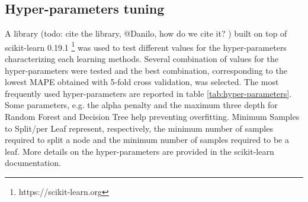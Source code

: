 \documentclass[a4paper, 10pt, conference]{ieeeconf}      %
\begin{document}
\subsection{Hyper-parameters tuning}

A library (todo: cite the library, \color{blue}
@Danilo, how do we cite it?
\color{black}) built on top of scikit-learn 0.19.1 \footnote{https://scikit-learn.org} was used to test different values for the hyper-parameters characterizing each learning methods.
Several combination of values for the hyper-parameters were tested and the best combination, corresponding to the lowest MAPE obtained with 5-fold cross validation, was selected.
The most frequently used hyper-parameters are reported in table \ref{tab:hyper-parameters}. 
Some parameters, e.g. the alpha penalty and the maximum three depth for Random Forest and Decision Tree help preventing overfitting. Minimum Samples to Split/per Leaf represent, respectively, the minimum number of samples required to split a node and the minimum number of samples required to be a leaf. More details on the hyper-parameters are provided in the scikit-learn documentation.
\end{document}
